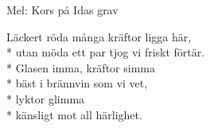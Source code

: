 \begin{SongText}
    \begin{SongInfo}
        Mel: Kors på Idas grav
    \end{SongInfo}
    \begin{SongVerse}
        Läckert röda många kräftor ligga här,\\*%
        utan möda ett par tjog vi friskt förtär.\\*%
        Glasen imma, kräftor simma\\*%
        bäst i brännvin som vi vet,\\*%
        lyktor glimma\\*%
        känsligt mot all härlighet.
    \end{SongVerse}
\end{SongText}
